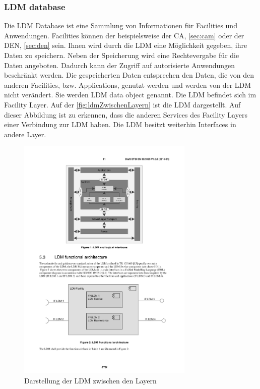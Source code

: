 \subsubsection{LDM database \label{facilitylayer_ldmdatabase}}
Die \ac{LDM} Database ist eine Sammlung von Informationen für Facilities und Anwendungen. Facilities können der beispielsweise der \ac{CA}, \autoref{sec:cam} oder der \ac{DEN}, \autoref{sec:den} sein. Ihnen wird durch die \ac{LDM} eine Möglichkeit gegeben, ihre Daten zu speichern. Neben der Speicherung wird eine Rechtevergabe für die Daten angeboten. Dadurch kann der Zugriff auf autorisierte Anwendungen beschränkt werden. Die gespeicherten Daten entsprechen den Daten, die von den anderen Facilities, bzw. Applications, genutzt werden und  werden von der  \ac{LDM} nicht verändert. Sie werden \ac{LDM} data object genannt. 
Die \ac{LDM} befindet sich im Facility Layer. Auf der \autoref{fig:ldmZwischenLayern} ist die \ac{LDM} dargestellt. Auf dieser Abbildung ist zu erkennen, dass die anderen Services des Facility Layers einer Verbindung zur \ac{LDM} haben. Die \ac{LDM} besitzt weiterhin Interfaces in andere Layer.

\begin{figure}[htbp]
	\includegraphics[width=0.75\textwidth]{content/images/04_facilitylayer/ldmLayer.pdf}
	\caption{Darstellung der LDM zwischen den Layern \cite{en302895}}
	\label{fig:ldmZwischenLayern}
\end{figure}

